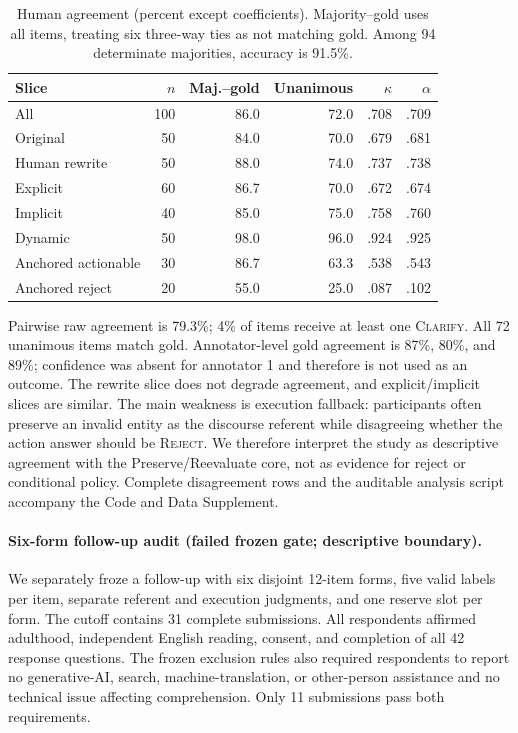 \documentclass[10pt]{article}
\begin{document}
\begin{table}[H]
\centering
\small
\begin{tabular}{lrrrrr}
\toprule
Slice & $n$ & Maj.--gold & Unanimous & $\kappa$ & $\alpha$\\
\midrule
All & 100 & 86.0 & 72.0 & .708 & .709\\
Original & 50 & 84.0 & 70.0 & .679 & .681\\
Human rewrite & 50 & 88.0 & 74.0 & .737 & .738\\
Explicit & 60 & 86.7 & 70.0 & .672 & .674\\
Implicit & 40 & 85.0 & 75.0 & .758 & .760\\
Dynamic & 50 & 98.0 & 96.0 & .924 & .925\\
Anchored actionable & 30 & 86.7 & 63.3 & .538 & .543\\
Anchored reject & 20 & 55.0 & 25.0 & .087 & .102\\
\bottomrule
\end{tabular}
\caption{Human agreement (percent except coefficients). Majority--gold uses all items, treating
six three-way ties as not matching gold. Among 94 determinate majorities, accuracy is 91.5\%.}
\end{table}

Pairwise raw agreement is 79.3\%; 4\% of items receive at least one \textsc{Clarify}. All 72
unanimous items match gold. Annotator-level gold agreement is 87\%, 80\%, and 89\%; confidence
was absent for annotator 1 and therefore is not used as an outcome. The rewrite slice does not
degrade agreement, and explicit/implicit slices are similar. The main weakness is execution
fallback: participants often preserve an invalid entity as the discourse referent while
disagreeing whether the action answer should be \textsc{Reject}. We therefore interpret the
study as descriptive agreement with the Preserve/Reevaluate core, not as evidence for reject or
conditional policy. Complete disagreement rows and the auditable analysis script accompany the
Code and Data Supplement.

\paragraph{Six-form follow-up audit (failed frozen gate; descriptive boundary).}
We separately froze a follow-up with six disjoint 12-item forms, five valid labels per item,
separate referent and execution judgments, and one reserve slot per form. The cutoff contains 31
complete submissions. All respondents affirmed adulthood, independent English reading, consent,
and completion of all 42 response questions. The frozen exclusion rules also required respondents
to report no generative-AI, search, machine-translation, or other-person assistance and no technical
issue affecting comprehension. Only 11 submissions pass both requirements.
\end{document}

